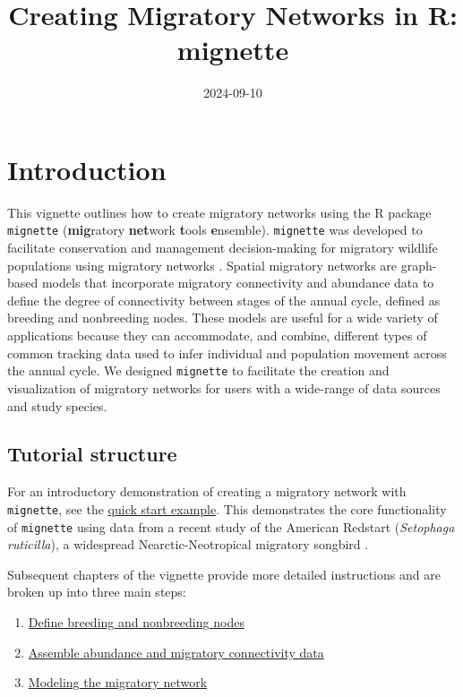 \documentclass[
]{book}
\title{Creating Migratory Networks in R: mignette}
\author{}
\date{\vspace{-2.5em}2024-09-10}
\providecommand{\tightlist}{%
  \setlength{\itemsep}{0pt}\setlength{\parskip}{0pt}}
\begin{document}
\maketitle

{
\setcounter{tocdepth}{1}
\tableofcontents
}
\hypertarget{introduction}{%
\chapter{Introduction}\label{introduction}}

This vignette outlines how to create migratory networks using the R package \texttt{mignette} (\textbf{mig}ratory \textbf{net}work \textbf{t}ools \textbf{e}nsemble). \texttt{mignette} was developed to facilitate conservation and management decision-making for migratory wildlife populations using migratory networks \citep{ruegg2020genoscape, taylor2010population}. Spatial migratory networks are graph-based models that incorporate migratory connectivity and abundance data to define the degree of connectivity between stages of the annual cycle, defined as breeding and nonbreeding nodes. These models are useful for a wide variety of applications because they can accommodate, and combine, different types of common tracking data used to infer individual and population movement across the annual cycle. We designed \texttt{mignette} to facilitate the creation and visualization of migratory networks for users with a wide-range of data sources and study species.

\hypertarget{tutorial-structure}{%
\section{Tutorial structure}\label{tutorial-structure}}

For an introductory demonstration of creating a migratory network with \texttt{mignette}, see the \protect\hyperlink{quickstart}{quick start example}. This demonstrates the core functionality of \texttt{mignette} using data from a recent study of the American Redstart (\emph{Setophaga ruticilla}), a widespread Nearctic-Neotropical migratory songbird \citep{desaix2023low}.

Subsequent chapters of the vignette provide more detailed instructions and are broken up into three main steps:

\begin{enumerate}
\def\labelenumi{\arabic{enumi}.}
\tightlist
\item
  \protect\hyperlink{nodes}{Define breeding and nonbreeding nodes}
\item
  \protect\hyperlink{data}{Assemble abundance and migratory connectivity data}
\item
  \protect\hyperlink{model}{Modeling the migratory network}
\end{enumerate}
\end{document}

